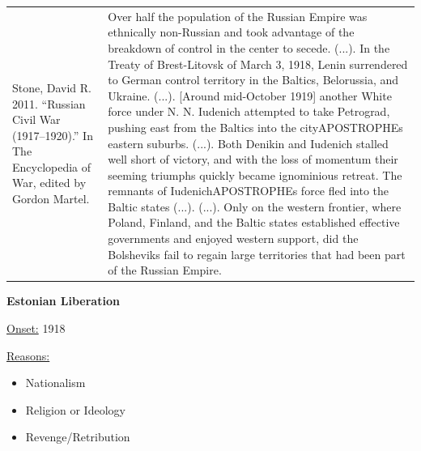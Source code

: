 {\begin{longtable}{p{}p{}}
Stone, David R. 2011. “Russian Civil War (1917–1920).” In The Encyclopedia of War, edited by Gordon Martel. & Over half the population of the Russian Empire was ethnically non-Russian and took advantage of the breakdown of control in the center to secede. (...). In the Treaty of Brest-Litovsk of March 3, 1918, Lenin surrendered to German control territory in the Baltics, Belorussia, and Ukraine. (...). [Around mid-October 1919] another White force under N. N. Iudenich attempted to take Petrograd, pushing east from the Baltics into the cityAPOSTROPHEs eastern suburbs. (...). Both Denikin and Iudenich stalled well short of victory, and with the loss of momentum their seeming triumphs quickly became ignominious retreat. The remnants of IudenichAPOSTROPHEs force fled into the Baltic states (...). (...). Only on the western frontier, where Poland, Finland, and the Baltic states established effective governments and enjoyed western support, did the Bolsheviks fail to regain large territories that had been part of the Russian Empire.
\\
\end{longtable}}
\clearpage
         \textbf{Estonian Liberation} 

          \underline{Onset:} 1918         

\underline{Reasons:}
\begin{itemize}
\item Nationalism
\item Religion or Ideology
\item Revenge/Retribution
\end{itemize}

